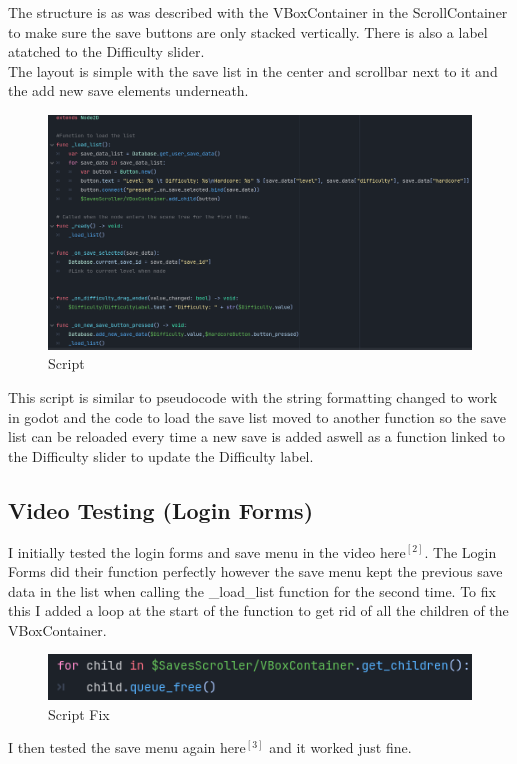 \documentclass{article}
\begin{document}
        The structure is as was described with the VBoxContainer in the ScrollContainer to make sure the save buttons are only stacked vertically. There is also a label atatched to the Difficulty slider.\\
        The layout is simple with the save list in the center and scrollbar next to it and the add new save elements underneath.\\
        \begin{figure}[H]
                \centering
                \includegraphics[width = 0.8\columnwidth]{images/development/SaveMenu_script.PNG}
                \caption{Script}
        \end{figure}
        This script is similar to pseudocode with the string formatting changed to work in godot and the code to load the save list moved to another function so the save list can be reloaded every time a new save is added aswell as a function linked to the Difficulty slider to update the Difficulty label.\\
        \newpage
        \subsection{Video Testing (Login Forms)}
        I initially tested the login forms and save menu in the video here$^{[2]}$.
        The Login Forms did their function perfectly however the save menu kept the previous save data in the list when calling the \_load\_list function for the second time. To fix this I added a loop at the start of the function to get rid of all the children of the VBoxContainer.\\
        \begin{figure}[H]
                \centering
                \includegraphics[width = 0.8\columnwidth]{images/development/SaveMenu_fix.PNG}
                \caption{Script Fix}
        \end{figure}
        I then tested the save menu again here$^{[3]}$ and it worked just fine.\\
\end{document}
